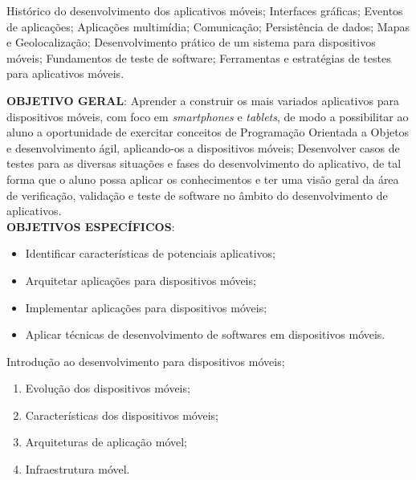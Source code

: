 \begin{pud}



	\ementa
	Histórico do desenvolvimento dos aplicativos móveis; Interfaces gráficas; Eventos de aplicações; Aplicações multimídia; Comunicação; Persistência de dados; Mapas e Geolocalização; Desenvolvimento prático de um sistema para dispositivos móveis; Fundamentos de teste de software; Ferramentas e estratégias de testes para aplicativos móveis.
	
	\objetivos
	\textbf{OBJETIVO GERAL}:
	Aprender a construir os mais variados aplicativos para dispositivos móveis, com foco em \textit{smartphones} e \textit{tablets}, de modo a possibilitar ao aluno a oportunidade de exercitar conceitos de Programação Orientada a Objetos e desenvolvimento ágil, aplicando-os a dispositivos móveis; Desenvolver casos de testes para as diversas situações e fases do desenvolvimento do aplicativo, de tal forma que o aluno possa aplicar os conhecimentos e ter uma visão geral da área de verificação, validação e teste de software no âmbito do desenvolvimento de aplicativos.	
	\newline\\	
	\textbf{OBJETIVOS ESPECÍFICOS}:
	\begin{itemize}
		
		\item Identificar características de potenciais aplicativos;
		\item Arquitetar aplicações para dispositivos móveis; 
		\item Implementar aplicações para dispositivos móveis; 
		\item Aplicar técnicas de desenvolvimento de softwares em dispositivos móveis. 

	\end{itemize}
	
	
	\programa
	\begin{description}[itemsep=0em]
		\item[UNIDADE I:] Introdução ao desenvolvimento para dispositivos móveis; 
	         \begin{enumerate}[itemsep=0em, topsep=0em]
				\item Evolução dos dispositivos móveis;
				\item Características dos dispositivos móveis;
				\item Arquiteturas de aplicação móvel;
				\item Infraestrutura móvel.
            \end{enumerate}
            

\end{description}
\end{pud}
